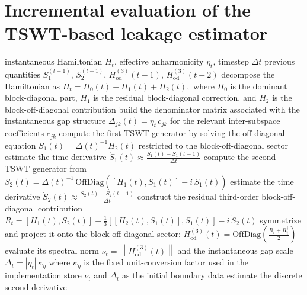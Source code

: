 \newpage
\section{Incremental evaluation of the TSWT-based leakage estimator}
\label{app:Incremental_TSWT}

\begin{algorithm}[H]
\caption{Incremental TSWT-based leakage estimator used during propagation}
\label{alg:tswt_leakage_appendix}
\begin{algorithmic}[1]
\Require instantaneous Hamiltonian $H_t$, effective anharmonicity $\eta_t$, timestep $\Delta t$
\Require previous quantities $S_1^{(t-1)}$, $S_2^{(t-1)}$, $H_{\mathrm{od}}^{(3)}(t-1)$, $H_{\mathrm{od}}^{(3)}(t-2)$
\State decompose the Hamiltonian as
\(
H_t = H_0(t) + H_1(t) + H_2(t),
\)
where $H_0$ is the dominant block-diagonal part, $H_1$ is the residual block-diagonal correction, and $H_2$ is the block-off-diagonal contribution
\State build the denominator matrix associated with the instantaneous gap structure
\(
\Delta_{jk}(t)=\eta_t\, c_{jk}
\)
for the relevant inter-subspace coefficients $c_{jk}$
\State compute the first TSWT generator by solving the off-diagonal equation
\(
S_1(t)=\Delta(t)^{-1} H_2(t)
\)
restricted to the block-off-diagonal sector
    \State estimate the time derivative
    \(
    \dot S_1(t)\approx \frac{S_1(t)-S_1(t-1)}{\Delta t}
    \)
\EndIf
\State compute the second TSWT generator from
\(
S_2(t)=\Delta(t)^{-1}\,\mathrm{OffDiag}\!\left([H_1(t),S_1(t)]-i\,\dot S_1(t)\right)
\)
    \State estimate the time derivative
    \(
    \dot S_2(t)\approx \frac{S_2(t)-S_2(t-1)}{\Delta t}
    \)
\EndIf
\State construct the residual third-order block-off-diagonal contribution
\(
R_t=[H_1(t),S_2(t)] + \frac{1}{3}[[H_2(t),S_1(t)],S_1(t)] - i\,\dot S_2(t)
\)
\State symmetrize and project it onto the block-off-diagonal sector:
\(
H_{\mathrm{od}}^{(3)}(t)=\mathrm{OffDiag}\!\left(\frac{R_t+R_t^\dagger}{2}\right)
\)
\State evaluate its spectral norm
\(
\nu_t=\left\|H_{\mathrm{od}}^{(3)}(t)\right\|
\)
and the instantaneous gap scale
\(
\Delta_t = |\eta_t|\,\kappa_{\eta}
\)
where $\kappa_{\eta}$ is the fixed unit-conversion factor used in the implementation
    \State store $\nu_t$ and $\Delta_t$ as the initial boundary data
\EndIf
{}
    \State estimate the discrete second derivative

\end{algorithmic}
\end{algorithm}
